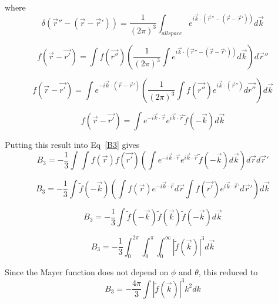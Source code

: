 \documentclass[12pt]{article}
\begin{document}
where
\begin{equation}{\delta}(\vec{r}''-(\vec{r}-\vec{r}'))={ \frac{1}{\left(2\pi\right)^3}\int_{allspace} e^{i\vec k\cdot (\vec{r}''-(\vec r-\vec r'))}d\vec{k}}\end{equation} 

\begin{equation}f(\vec{r}-\vec{r'})=\int{f(\vec{r''})\left( \frac{1}{\left(2\pi\right)^3}\int e^{i\vec k\cdot (\vec{r}''-(\vec r-\vec r'))}d\vec{k} \right) d\vec r''} \end{equation}

\begin{equation}f(\vec{r}-\vec{r'})=\int{ e^{-i\vec k\cdot (\vec r-\vec r')}\left(\frac{1}{\left(2\pi\right)^3}\int{f(\vec{r''}) e^{i\vec k\cdot (\vec{r}'')}d\vec{r''}} \right) d\vec k} \end{equation}

\begin{equation}f(\vec{r}-\vec{r'})=\int{ e^{-i\vec k\cdot \vec r}e^{i\vec k\cdot \vec r}\widetilde{f}(-\vec k) d\vec k} \end{equation}

Putting this result into Eq~\ref{B3} gives
\begin{equation}B_3=-\frac{1}{3}\int{\int{f(\vec{r})f(\vec{r'})\left(\int{ e^{-i\vec k\cdot \vec r}e^{i\vec k\cdot \vec r}\widetilde{f}(-\vec k) d\vec k}\right)d\vec rd\vec r'}}\end{equation}

\begin{equation}B_3=-\frac{1}{3}\int{\widetilde{f}(-\vec k)\left(\int{f(\vec{r})e^{-i\vec k\cdot \vec r}}d\vec r\int{f(\vec{r'})e^{i\vec k\cdot \vec r'} d\vec r'}\right)d\vec k}\end{equation}

\begin{equation}B_3=-\frac{1}{3}\int{\widetilde{f}(-\vec k)\widetilde{f}(\vec k)\widetilde{f}(-\vec k)d\vec k}\end{equation}

\begin{equation}B_3=-\frac{1}{3}\int_0^{2\pi}\int_0^{\pi}\int_0^{\infty}{|\widetilde{f}(\vec k)|^3d\vec k}\end{equation}

Since the Mayer function does not depend on $\phi$ and $\theta$, this reduced to
\begin{equation}B_3=-\frac{4\pi}{3}\int{|\widetilde{f}(\vec k)|^3k^2dk}\end{equation}
\end{document}
